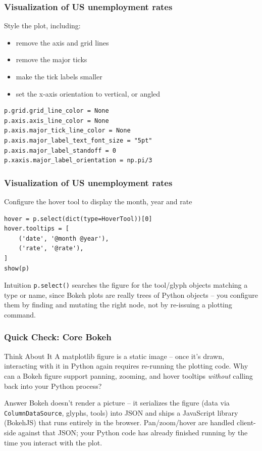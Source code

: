 \begin{frame}[fragile] \frametitle{Visualization of US unemployment rates}
Style the plot, including:
\begin{itemize}
\item remove the axis and grid lines
\item remove the major ticks
\item make the tick labels smaller
\item set the x-axis orientation to vertical, or angled
\end{itemize}
\begin{lstlisting}
p.grid.grid_line_color = None
p.axis.axis_line_color = None
p.axis.major_tick_line_color = None
p.axis.major_label_text_font_size = "5pt"
p.axis.major_label_standoff = 0
p.xaxis.major_label_orientation = np.pi/3
\end{lstlisting}
\end{frame}

\begin{frame}[fragile] \frametitle{Visualization of US unemployment rates}
Configure the hover tool to display the month, year and rate
\begin{lstlisting}
hover = p.select(dict(type=HoverTool))[0]
hover.tooltips = [
    ('date', '@month @year'),
    ('rate', '@rate'),
]
show(p)
\end{lstlisting}
\begin{block}{Intuition}
\texttt{p.select()} searches the figure for the tool/glyph objects matching a type or name, since Bokeh plots are really trees of Python objects -- you configure them by finding and mutating the right node, not by re-issuing a plotting command.
\end{block}
\end{frame}

\begin{frame}[fragile]\frametitle{Quick Check: Core Bokeh}
\begin{block}{Think About It}
A matplotlib figure is a static image -- once it's drawn, interacting with it in Python again requires re-running the plotting code. Why can a Bokeh figure support panning, zooming, and hover tooltips \emph{without} calling back into your Python process?
\end{block}
\pause
\begin{block}{Answer}
Bokeh doesn't render a picture -- it serializes the figure (data via \texttt{ColumnDataSource}, glyphs, tools) into JSON and ships a JavaScript library (BokehJS) that runs entirely in the browser. Pan/zoom/hover are handled client-side against that JSON; your Python code has already finished running by the time you interact with the plot.
\end{block}
\end{frame}

